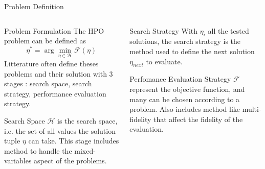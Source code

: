 \begin{frame}{Problem Definition}

    \begin{columns}
    
        \begin{column}[t]{0.5\textwidth}
        \begin{block}{Problem Formulation}
            The HPO problem can be defined as 
            \begin{equation}
               \eta^* = \arg\min_{\eta \in \mathcal{H}} \mathcal{F}(\eta) 
            \end{equation}
            Litterature often define theses problems and their solution with 3 stages : search space, search strategy, performance evaluation strategy.

        \end{block}

        \begin{block}{Search Space}
            $\mathcal{H}$ is the search space, i.e. the set of all values the solution tuple $\eta$ can take. This stage includes method to handle the mixed-variables aspect of the problems.   
        \end{block}
        \end{column}
        
        \begin{column}[t]{0.5\textwidth}

    
        \begin{block}{Search Strategy}
            With $\eta_i$ all the tested solutions, the search strategy is the method used to define the next solution $\eta_{next}$ to evaluate. 
        \end{block}

        \begin{block}{Perfomance Evaluation Strategy}
            $\mathcal{F}$ represent the objective function, and many can be chosen according to a problem. Also includes method like multi-fidelity that affect the fidelity of the evaluation.
        \end{block}

        \end{column}
         
  \end{columns}
\end{frame}


